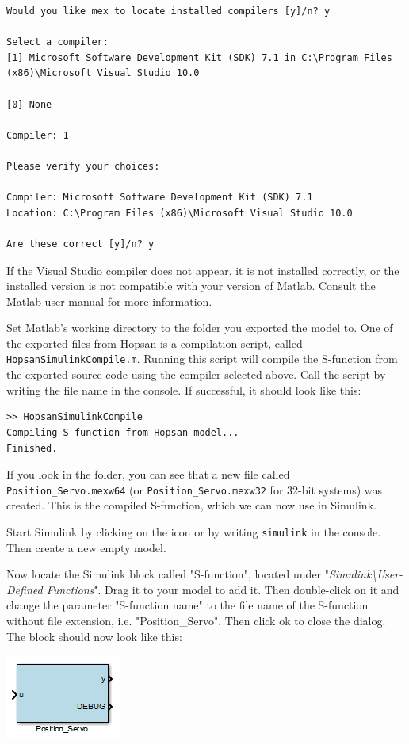 \documentclass[a4paper]{article}
\begin{document}
\begin{enumerate}
\begin{lstlisting}
Would you like mex to locate installed compilers [y]/n? y
 
Select a compiler: 
[1] Microsoft Software Development Kit (SDK) 7.1 in C:\Program Files (x86)\Microsoft Visual Studio 10.0 
 
[0] None 
 
Compiler: 1
 
Please verify your choices: 
 
Compiler: Microsoft Software Development Kit (SDK) 7.1 
Location: C:\Program Files (x86)\Microsoft Visual Studio 10.0 
 
Are these correct [y]/n? y
\end{lstlisting}

If the Visual Studio compiler does not appear, it is not installed correctly, or the installed version is not compatible with your version of Matlab. 
Consult the Matlab user manual for more information.

Set Matlab's working directory to the folder you exported the model to.
One of the exported files from Hopsan is a compilation script, called \texttt{HopsanSimulinkCompile.m}.
Running this script will compile the S-function from the exported source code using the compiler selected above. 
Call the script by writing the file name in the console. 
If successful, it should look like this: 

\begin{lstlisting}
>> HopsanSimulinkCompile
Compiling S-function from Hopsan model...
Finished.
\end{lstlisting}

If you look in the folder, you can see that a new file called \texttt{Position\_Servo.mexw64} (or \texttt{Position\_Servo.mexw32} for 32-bit systems) was created. This is the compiled S-function, which we can now use in Simulink.

Start Simulink by clicking on the icon or by writing \texttt{simulink} in the console. Then create a new empty model.

Now locate the Simulink block called "S-function", located under "\textit{Simulink\textbackslash User-Defined Functions}". 
Drag it to your model to add it. 
Then double-click on it and change the parameter "S-function name" to the file name of the S-function without file extension, i.e. "Position\_Servo". 
Then click ok to close the dialog.
The block should now look like this:

\includegraphics{gfx/simulink/sfunction.png}


\end{enumerate}
\end{document}
